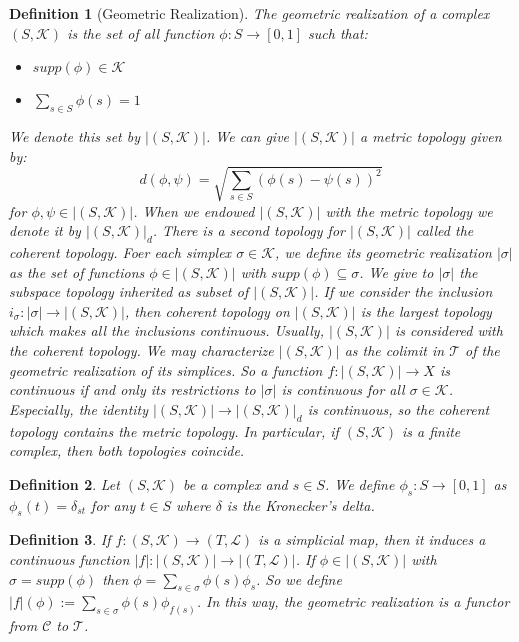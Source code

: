 \documentclass{amsart}
\newtheorem{definition}{Definition}[section]
\begin{document}
\begin{definition}[Geometric Realization]
The geometric realization of a complex $(S,\mathcal{K})$ is the set of all function $\phi\colon S\longrightarrow [0,1]$ such that:
\begin{itemize}
\item $supp(\phi)\in\mathcal{K}$
\item $\sum_{s\in S}\phi(s)=1$
\end{itemize}
We denote this set by $\vert (S,\mathcal{K})\vert$. We can give $\vert (S,\mathcal{K})\vert$ a metric topology given by:
\[
d(\phi,\psi)=\sqrt{\sum_{s\in S}(\phi(s)-\psi(s))^{2}}
\]
for $\phi,\psi\in \vert (S,\mathcal{K})\vert$. When we endowed $\vert (S,\mathcal{K})\vert$ with the metric topology we denote it by $\vert (S,\mathcal{K})\vert_d$. There is a second topology for $\vert (S,\mathcal{K})\vert$ called the coherent topology. Foer each simplex $\sigma\in\mathcal{K}$, we define its geometric realization $\vert\sigma\vert$ as the set of functions $\phi\in \vert (S,\mathcal{K})\vert$ with $supp(\phi)\subseteq \sigma$. We give to $\vert \sigma\vert$ the subspace topology inherited as subset of $\vert (S,\mathcal{K})\vert$. If we consider the inclusion $i_\sigma\colon\vert\sigma\vert\longrightarrow \vert (S,\mathcal{K})\vert$, then coherent topology on $\vert (S,\mathcal{K})\vert$ is the largest topology which makes all the inclusions continuous. Usually, $\vert (S,\mathcal{K})\vert$ is considered with the coherent topology. We may characterize $\vert (S,\mathcal{K})\vert$ as the colimit  in $\mathcal{T}$ of the geometric realization of its simplices. So a function $f\colon\vert (S,\mathcal{K})\vert\longrightarrow X$ is continuous if and only its restrictions to $\vert\sigma\vert$ is continuous for all $\sigma\in\mathcal{K}$. Especially, the identity $\vert (S,\mathcal{K})\vert\longrightarrow \vert (S,\mathcal{K})\vert_d$ is continuous, so the coherent topology contains the metric topology. In particular, if $(S,\mathcal{K})$ is a finite complex, then both topologies coincide.
\end{definition}


\begin{definition}
Let $(S,\mathcal{K})$ be a complex and $s\in S$. We define $\phi_s\colon S\longrightarrow [0,1]$ as $\phi_s(t)=\delta_{st}$ for any $t\in S$ where $\delta$ is the Kronecker's delta.
\end{definition}

\begin{definition}
If $f\colon (S,\mathcal{K})\longrightarrow (T,\mathcal{L})$ is a simplicial map, then it induces a continuous function $\vert f\vert\colon \vert(S,\mathcal{K})\vert\longrightarrow \vert(T,\mathcal{L})\vert$. If $\phi\in \vert(S,\mathcal{K})\vert$ with $\sigma=supp(\phi)$ then $\phi=\sum_{s\in\sigma}\phi(s)\phi_s$. So  we define $\vert f\vert (\phi):=\sum_{s\in \sigma}\phi(s)\phi_{f(s)}$. In this way, the geometric realization is a functor from $\mathcal{C}$ to $\mathcal{T}$.
\end{definition}
\end{document}
